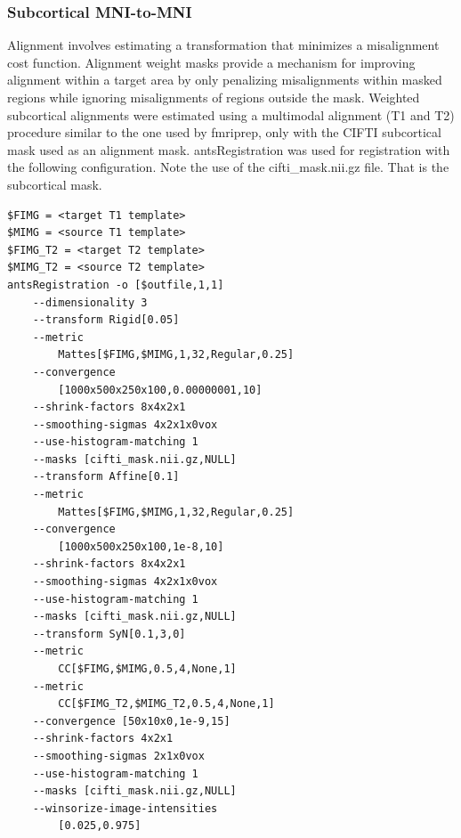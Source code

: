 \documentclass[10pt,letterpaper]{article}
\begin{document}
\subsubsection{Subcortical MNI-to-MNI} Alignment involves estimating a transformation that minimizes a misalignment cost function. Alignment weight masks provide a mechanism for improving alignment within a target area by only penalizing misalignments within masked regions while ignoring misalignments of regions outside the mask. Weighted subcortical alignments were estimated using a multimodal alignment (T1 and T2) procedure similar to the one used by fmriprep, only with the CIFTI subcortical mask used as an alignment mask. antsRegistration was used for registration with the following configuration. Note the use of the cifti\_mask.nii.gz file. That is the subcortical mask.
\begin{lstlisting}
$FIMG = <target T1 template>
$MIMG = <source T1 template>
$FIMG_T2 = <target T2 template>
$MIMG_T2 = <source T2 template>
antsRegistration -o [$outfile,1,1]
    --dimensionality 3
    --transform Rigid[0.05] 
    --metric 
        Mattes[$FIMG,$MIMG,1,32,Regular,0.25]
    --convergence 
        [1000x500x250x100,0.00000001,10]
    --shrink-factors 8x4x2x1
    --smoothing-sigmas 4x2x1x0vox
    --use-histogram-matching 1
    --masks [cifti_mask.nii.gz,NULL]
    --transform Affine[0.1]
    --metric 
        Mattes[$FIMG,$MIMG,1,32,Regular,0.25]
    --convergence 
        [1000x500x250x100,1e-8,10]
    --shrink-factors 8x4x2x1
    --smoothing-sigmas 4x2x1x0vox
    --use-histogram-matching 1
    --masks [cifti_mask.nii.gz,NULL]
    --transform SyN[0.1,3,0]
    --metric 
        CC[$FIMG,$MIMG,0.5,4,None,1]
    --metric 
        CC[$FIMG_T2,$MIMG_T2,0.5,4,None,1]
    --convergence [50x10x0,1e-9,15]
    --shrink-factors 4x2x1
    --smoothing-sigmas 2x1x0vox
    --use-histogram-matching 1
    --masks [cifti_mask.nii.gz,NULL]
    --winsorize-image-intensities 
        [0.025,0.975] 
\end{lstlisting}
\end{document}
